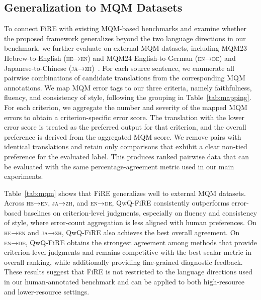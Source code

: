 \documentclass{article}
\theoremstyle{plain}
\theoremstyle{definition}
\theoremstyle{remark}
\newcommand{\heen}{\textsc{he→en} }
\newcommand{\engdex}{\textsc{en→de}}
\newcommand{\jazhx}{\textsc{ja→zh}}
\newcommand{\heenx}{\textsc{he→en}}
\newcommand{\ours}{FiRE }
\begin{document}
\subsection{Generalization to MQM Datasets}\label{sec:mqm_datasets}

To connect \ours with existing MQM-based benchmarks and examine whether the proposed framework generalizes beyond the two language directions in our benchmark, we further evaluate on external MQM datasets, including MQM23 Hebrew-to-English (\heenx) and MQM24 English-to-German (\engdex) and Japanese-to-Chinese (\jazhx)~\citep{freitag2021experts}. For each source sentence, we enumerate all pairwise combinations of candidate translations from the corresponding MQM annotations. We map MQM error tags to our three criteria, namely faithfulness, fluency, and consistency of style, following the grouping in Table~\ref{tab:mapping}. For each criterion, we aggregate the number and severity of the mapped MQM errors to obtain a criterion-specific error score. The translation with the lower error score is treated as the preferred output for that criterion, and the overall preference is derived from the aggregated MQM score. We remove pairs with identical translations and retain only comparisons that exhibit a clear non-tied preference for the evaluated label. This produces ranked pairwise data that can be evaluated with the same percentage-agreement metric used in our main experiments.

Table~\ref{tab:mqm} shows that FiRE generalizes well to external MQM datasets. Across \heenx, \jazhx, and \engdex, QwQ-FiRE consistently outperforms error-based baselines on criterion-level judgments, especially on fluency and consistency of style, where error-count aggregation is less aligned with human preferences. On \heen and \jazhx, QwQ-FiRE also achieves the best overall agreement. On \engdex, QwQ-FiRE obtains the strongest agreement among methods that provide criterion-level judgments and remains competitive with the best scalar metric in overall ranking, while additionally providing fine-grained diagnostic feedback. These results suggest that FiRE is not restricted to the language directions used in our human-annotated benchmark and can be applied to both high-resource and lower-resource settings.


\end{document}
